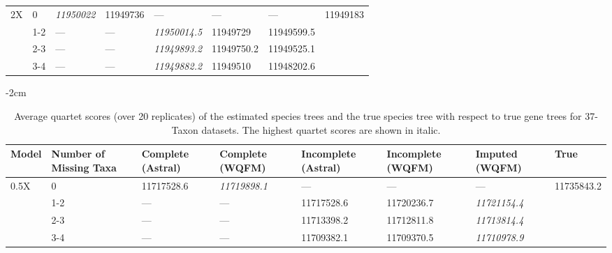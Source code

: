 \documentclass[10pt,a4paper]{article}
\begin{document}
\begin{appendices}
\begin{table}[H]
\begin{tabularx}{1.2\textwidth}{|X|X|X|X|X|X|X|X|}
    \multirow{4}{0.25\textwidth}{2X} 
    & 0 & \textit{11950022} &	11949736 & --- & --- & --- & \multirow{4}{0.25\textwidth}{11949183}  \\ \cline{2-7}
    & 1-2 & --- &	---  &	\textit{11950014.5}	
    &	11949729  &	11949599.5 & \\ \cline{2-7}
    & 2-3 & --- &	---  &	\textit{11949893.2}		
    &	11949750.2  &	11949525.1 &  \\ \cline{2-7}
    & 3-4 & --- &	---  &	\textit{11949882.2}		
    &	11949510  & 11948202.6 &  \\ \cline{2-7}
    
    \hline
        
    
\end{tabularx}

\end{table}

% 

\begin{table}[H]
  \small
  \centering
    \addtolength{\leftskip} {-2cm} %
    \addtolength{\rightskip}{-2cm}
    \caption{Average quartet scores (over 20 replicates) of the estimated species trees and the true species tree with respect to true gene trees for 37-Taxon datasets. %
    The highest quartet scores are shown in italic.}
    \label{tab:qscore-37-true}
\begin{tabularx}{1.2\textwidth}{|X|X|X|X|X|X|X|X|}


\hline
    Model & Number of Missing Taxa  & Complete (Astral)  & Complete (WQFM) & Incomplete (Astral) & Incomplete (WQFM)  &	Imputed (WQFM) & True \\
    \hline\hline
    \multirow{4}{0.25\textwidth}{0.5X} 
    & 0   & 11717528.6	& \textit{11719898.1} & --- & --- & --- & \multirow{4}{0.25\textwidth}{11735843.2}  \\ \cline{2-7}
    & 1-2 & --- & --- &	11717528.6	 & 	11720236.7
    & \textit{11721154.4} &  \\ \cline{2-7}
    & 2-3 & --- & ---  &	11713398.2	& 11712811.8
    & \textit{11713814.4} & \\ \cline{2-7}
    & 3-4 & ---	& ---  &	11709382.1		
    & 11709370.5	& \textit{11710978.9} & \\ \cline{2-7}
    \hline
    

\end{tabularx}
\end{table}
\end{appendices}
\end{document}
